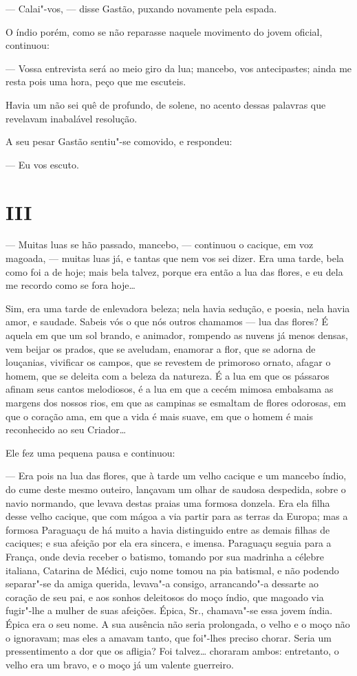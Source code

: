 --- Calai"-vos, --- disse Gastão, puxando novamente pela espada.

O índio porém, como se não reparasse naquele movimento do jovem oficial,
continuou:

--- Vossa entrevista será ao meio giro da lua; mancebo, vos
antecipastes; ainda me resta pois uma hora, peço que me escuteis.

Havia um não sei quê de profundo, de solene, no acento dessas palavras
que revelavam inabalável resolução.

A seu pesar Gastão sentiu"-se comovido, e respondeu:

--- Eu vos escuto.

\section*{III}

--- Muitas luas se hão passado, mancebo, --- continuou o cacique, em voz
magoada, --- muitas luas já, e tantas que nem vos sei dizer. Era uma
tarde, bela como foi a de hoje; mais bela talvez, porque era então a lua
das flores, e eu dela me recordo como se fora hoje\ldots{}

Sim, era uma tarde de enlevadora beleza; nela havia sedução, e poesia,
nela havia amor, e saudade. Sabeis vós o que nós outros chamamos --- lua
das flores? É aquela em que um sol brando, e animador, rompendo as
nuvens já menos densas, vem beijar os prados, que se aveludam, enamorar
a flor, que se adorna de louçanias, vivificar os campos, que se revestem
de primoroso ornato, afagar o homem, que se deleita com a beleza da
natureza. É a lua em que os pássaros afinam seus cantos melodiosos, é a
lua em que a cecém mimosa embalsama as margens dos nossos rios, em que
as campinas se esmaltam de flores odorosas, em que o coração ama, em que
a vida é mais suave, em que o homem é mais reconhecido ao seu Criador\ldots{}

Ele fez uma pequena pausa e continuou:

--- Era pois na lua das flores, que à tarde um velho cacique e um
mancebo índio, do cume deste mesmo outeiro, lançavam um olhar de saudosa
despedida, sobre o navio normando, que levava destas praias uma formosa
donzela. Era ela filha desse velho cacique, que com mágoa a via partir
para as terras da Europa; mas a formosa Paraguaçu de há muito a havia
distinguido entre as demais filhas de caciques; e sua afeição por ela
era sincera, e imensa. Paraguaçu seguia para a França, onde devia
receber o batismo, tomando por sua madrinha a célebre italiana, Catarina
de Médici, cujo nome tomou na pia batismal, e não podendo separar"-se da
amiga querida, levava"-a consigo, arrancando"-a dessarte ao coração de seu
pai, e aos sonhos deleitosos do moço índio, que magoado via fugir"-lhe a
mulher de suas afeições. Épica, Sr., chamava"-se essa jovem índia. Épica
era o seu nome. A sua ausência não seria prolongada, o velho e o moço
não o ignoravam; mas eles a amavam tanto, que foi"-lhes preciso chorar.
Seria um pressentimento a dor que os afligia? Foi talvez\ldots{} choraram
ambos: entretanto, o velho era um bravo, e o moço já um valente
guerreiro.

